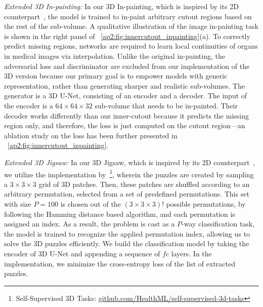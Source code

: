 \textit{Extended 3D In-painting:} In our 3D In-painting, which is inspired by its 2D counterpart~\citep{pathak2016context}, the model is trained to in-paint arbitrary cutout regions based on the rest of the sub-volume. A qualitative illustration of the image in-painting task is shown in the right panel of \figurename~\ref{ap2:fig:innercutout_inpainting}(a). To correctly predict missing regions, networks are required to learn local continuities of organs in medical images via interpolation. Unlike the original in-painting, the adversarial loss and discriminator are excluded from our implementation of the 3D version because our primary goal is to empower models with generic representation, rather than generating sharper and realistic sub-volumes. The generator is a 3D U-Net, consisting of an encoder and a decoder. The input of the encoder is a $64\times 64\times 32$ sub-volume that needs to be in-painted. 
Their decoder works differently than our inner-cutout because it predicts the missing region only, and therefore, the loss is just computed on the cutout region---an ablation study on the loss has been further presented in \figurename~\ref{ap2:fig:innercutout_inpainting}.


\textit{Extended 3D Jigsaw:} In our 3D Jigsaw, which is inspired by its 2D counterpart~\citep{noroozi2016unsupervised}, we utilize the implementation by~\citet{taleb20203d}\footnote{\label{foot:3d_self_learning}Self-Supervised 3D Tasks: \href{https://github.com/HealthML/self-supervised-3d-tasks}{github.com/HealthML/self-supervised-3d-tasks}}, wherein the puzzles are created by sampling a $3\times 3\times 3$ grid of 3D patches. Then, these patches are shuffled according to an arbitrary permutation, selected from a set of predefined permutations. This set with size $P=100$ is chosen out of the $(3\times 3\times 3)!$ possible permutations, by following the Hamming distance based algorithm, and each permutation is assigned an index. As a result, the problem is cast as a $P$-way classification task, \ie the model is trained to recognize the applied permutation index, allowing us to solve the 3D puzzles efficiently. We build the classification model by taking the encoder of 3D U-Net and appending a sequence of $fc$ layers. In the implementation, we minimize the cross-entropy loss of the list of extracted puzzles.


